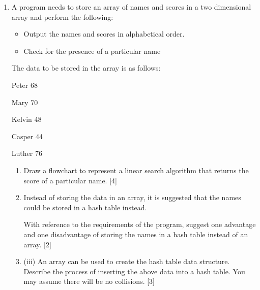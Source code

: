 \begin{enumerate}
\begin{minipage}[t]{1\columnwidth}
\texttt{23\qquad{}\qquad{}\qquad{}\qquad{}CALL Quicksort(L, PivotPos
- 1, MyList) }

\texttt{24\qquad{}\qquad{}\qquad{}\qquad{}}\texttt{\textbf{E}}\texttt{ }

\texttt{25\qquad{}\qquad{}ENDIF }

\texttt{26\qquad{}ENDPROCEDURE}%
\end{minipage}
\begin{enumerate}
\item Write pseudo-code to replace \texttt{\textbf{A}}, \texttt{\textbf{B}},
\texttt{\textbf{C}}, \texttt{\textbf{D}} and \texttt{\textbf{E}} in
the above algorithm. \hfill{}{[}5{]}
\item State the time complexity of the algorithm in the above pseudo-code.
\hfill{} {[}1{]}
\item State and explain when the worst case scenario (for running time)
for quicksort arises in the above algorithm. \hfill{}{[}3{]}
\item Another programmer suggested insertion sort would be more efficient
during the worst case scenario in (iii).

State and explain if insertion sort is indeed more efficient in this
instance. \hfill{}{[}2{]}
\end{enumerate}
\item A program needs to store an array of names and scores in a two dimensional
array and perform the following:
\begin{itemize}
\item Output the names and scores in alphabetical order. 
\item Check for the presence of a particular name
\end{itemize}
The data to be stored in the array is as follows:

Peter 68 

Mary 70 

Kelvin 48 

Casper 44 

Luther 76
\begin{enumerate}
\item Draw a flowchart to represent a linear search algorithm that returns
the score of a particular name. \hfill{} {[}4{]}
\item Instead of storing the data in an array, it is suggested that the
names could be stored in a hash table instead. 

With reference to the requirements of the program, suggest one advantage
and one disadvantage of storing the names in a hash table instead
of an array. \hfill{} {[}2{]}
\item (iii) An array can be used to create the hash table data structure.
Describe the process of inserting the above data into a hash table.
You may assume there will be no collisions. \hfill{} {[}3{]}
\end{enumerate}
\end{enumerate}